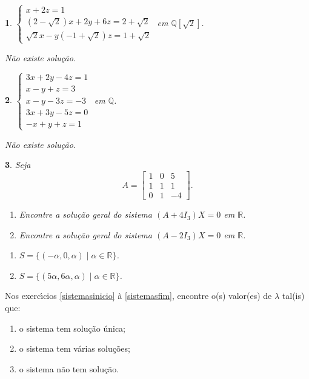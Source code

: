 \documentclass[12pt]{exam}
\newtheorem{exercicio}{}
\newcommand{\rac}{\mathbb{Q}}
\newcommand{\real}{\mathbb{R}}
\begin{document}
\begin{exercicio}
  $\begin{cases}
    x + 2z = 1\\
    (2 - \sqrt{2})x + 2y + 6z = 2 + \sqrt{2}\\
    \sqrt{2}x - y (-1 + \sqrt{2})z = 1 + \sqrt{2}
  \end{cases}$ em $\rac[\sqrt{2}]$.
  \begin{solucao}
    N\~ao existe solu\c{c}\~ao.
  \end{solucao}
\end{exercicio}


\begin{exercicio}\label{sistemalinearfim}
  $\begin{cases}
    3x + 2y - 4z = 1\\
    x - y + z = 3\\
    x - y - 3z = -3\\
    3x + 3y - 5z =0\\
    -x + y + z = 1
  \end{cases}$ em $\rac$.
\begin{solucao}
  N\~ao existe solu\c{c}\~ao.
\end{solucao}
\end{exercicio}

\begin{exercicio}
  Seja
  \[
    A = \begin{bmatrix}
      1 & 0 & 5\\
      1 & 1 & 1\\
      0 & 1 & -4
    \end{bmatrix}.
  \]
\begin{enumerate}[label={\alph*})]
  \item Encontre a solu\c{c}\~ao geral do sistema $(A + 4I_3)X = 0$ em $\real$.
  \item Encontre a solu\c{c}\~ao geral do sistema $(A - 2I_3)X = 0$ em $\real$.
\end{enumerate}
\begin{solucao}
  \begin{enumerate}[label={\alph*})]
    \item $S = \{(-\alpha, 0, \alpha) \mid \alpha \in \real\}$.
    \item $S = \{(5\alpha, 6\alpha, \alpha) \mid \alpha \in \real\}$.
  \end{enumerate}
\end{solucao}
\end{exercicio}

Nos exerc{\'\i}cios \ref{sistemasinicio} \`a \ref{sistemasfim}, encontre o(s) valor(es) de $\lambda$ tal(is) que:
\begin{enumerate}[label={\alph*})]
  \item o sistema tem solu\c{c}\~ao \'unica;
  \item o sistema tem v\'arias solu\c{c}\~oes;
  \item o sistema n\~ao tem solu\c{c}\~ao.
\end{enumerate}
\end{document}
